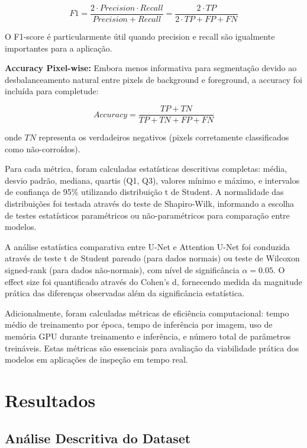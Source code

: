 \documentclass[12pt,a4paper,twoside]{article}
\begin{document}
\begin{equation}
F1 = \frac{2 \cdot Precision \cdot Recall}{Precision + Recall} = \frac{2 \cdot TP}{2 \cdot TP + FP + FN}
\end{equation}

O F1-score é particularmente útil quando precision e recall são igualmente importantes para a aplicação.

\textbf{Accuracy Pixel-wise:} Embora menos informativa para segmentação devido ao desbalanceamento natural entre pixels de background e foreground, a accuracy foi incluída para completude:

\begin{equation}
Accuracy = \frac{TP + TN}{TP + TN + FP + FN}
\end{equation}

onde $TN$ representa os verdadeiros negativos (pixels corretamente classificados como não-corroídos).

Para cada métrica, foram calculadas estatísticas descritivas completas: média, desvio padrão, mediana, quartis (Q1, Q3), valores mínimo e máximo, e intervalos de confiança de 95\% utilizando distribuição t de Student. A normalidade das distribuições foi testada através do teste de Shapiro-Wilk, informando a escolha de testes estatísticos paramétricos ou não-paramétricos para comparação entre modelos.

A análise estatística comparativa entre U-Net e Attention U-Net foi conduzida através de teste t de Student pareado (para dados normais) ou teste de Wilcoxon signed-rank (para dados não-normais), com nível de significância $\alpha=0.05$. O effect size foi quantificado através do Cohen's d, fornecendo medida da magnitude prática das diferenças observadas além da significância estatística.

Adicionalmente, foram calculadas métricas de eficiência computacional: tempo médio de treinamento por época, tempo de inferência por imagem, uso de memória GPU durante treinamento e inferência, e número total de parâmetros treináveis. Estas métricas são essenciais para avaliação da viabilidade prática dos modelos em aplicações de inspeção em tempo real.

\section{Resultados}
\label{sec:resultados}

\subsection{Análise Descritiva do Dataset}
\label{subsec:analise_dataset}
\end{document}
